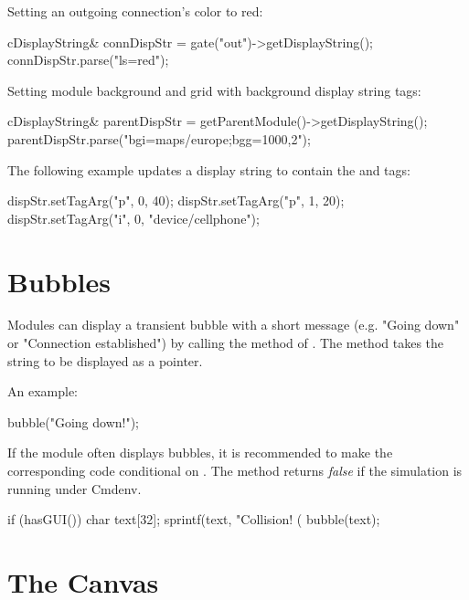 Setting an outgoing connection's color to red:

\begin{cpp}
cDisplayString& connDispStr = gate("out")->getDisplayString();
connDispStr.parse("ls=red");
\end{cpp}

Setting module background and grid with background display string tags:

\begin{cpp}
cDisplayString& parentDispStr = getParentModule()->getDisplayString();
parentDispStr.parse("bgi=maps/europe;bgg=1000,2");
\end{cpp}

The following example updates a display string to contain the  and
 tags:

\begin{cpp}
dispStr.setTagArg("p", 0, 40);
dispStr.setTagArg("p", 1, 20);
dispStr.setTagArg("i", 0, "device/cellphone");
\end{cpp}

\section{Bubbles}
\label{sec:graphics:bubbles}

Modules can display a transient bubble with a short message (e.g. "Going
down" or "Connection established") by calling the  method of
. The method takes the string to be displayed as a
 pointer.

An example:
\begin{cpp}
bubble("Going down!");
\end{cpp}

\begin{center}
\end{center}

If the module often displays bubbles, it is recommended to make the
corresponding code conditional on . The 
method returns \textit{false} if the simulation is running under Cmdenv.

\begin{cpp}
if (hasGUI()) {
    char text[32];
    sprintf(text, "Collision! (%
    bubble(text);
}
\end{cpp}



\section{The Canvas}
\label{sec:graphics:canvas}

